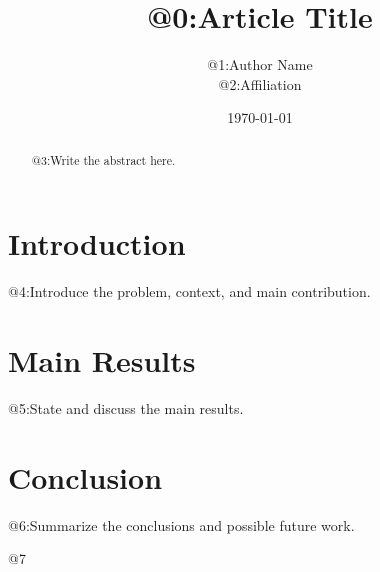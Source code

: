 \documentclass[11pt,reqno]{article}
\title{@{0:Article Title}}
\author{@{1:Author Name}\\
  \small @{2:Affiliation}}
\date{\today}
\numberwithin{equation}{section}
\theoremstyle{plain}
\theoremstyle{definition}
\theoremstyle{remark}
\begin{document}
\maketitle

\begin{abstract}
@{3:Write the abstract here.}
\end{abstract}

\section{Introduction}

@{4:Introduce the problem, context, and main contribution.}

\section{Main Results}

@{5:State and discuss the main results.}

\section{Conclusion}

@{6:Summarize the conclusions and possible future work.}




@7
\end{document}
